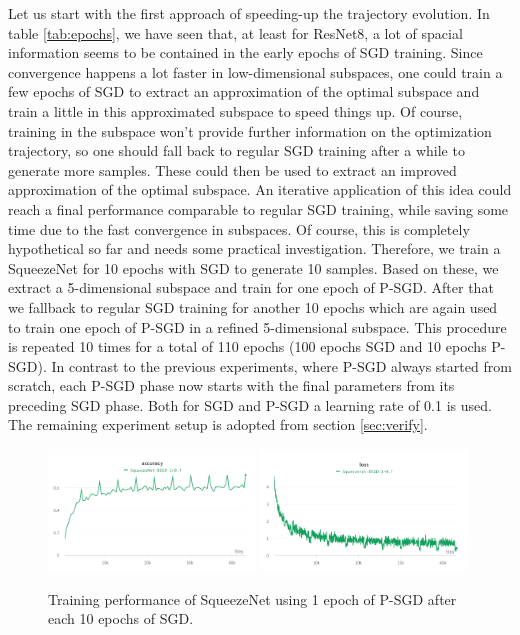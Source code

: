 \documentclass[11pt, a4paper]{article}
\begin{document}
Let us start with the first approach of speeding-up the trajectory evolution. In table \ref{tab:epochs}, we have seen that, at least for ResNet8, a lot of spacial information seems to be contained in the early epochs of SGD training. Since convergence happens a lot faster in low-dimensional subspaces, one could train a few epochs of SGD to extract an approximation of the optimal subspace and train a little in this approximated subspace to speed things up. Of course, training in the subspace won't provide further information on the optimization trajectory, so one should fall back to regular SGD training after a while to generate more samples. These could then be used to extract an improved approximation of the optimal subspace. An iterative application of this idea could reach a final performance comparable to regular SGD training, while saving some time due to the fast convergence in subspaces. Of course, this is completely hypothetical so far and needs some practical investigation. 
Therefore, we train a SqueezeNet for 10 epochs with SGD to generate 10 samples. Based on these, we extract a 5-dimensional subspace and train for one epoch of P-SGD. After that we fallback to regular SGD training for another 10 epochs which are again used to train one epoch of P-SGD in a refined 5-dimensional subspace. This procedure is repeated 10 times for a total of 110 epochs (100 epochs SGD and 10 epochs P-SGD). In contrast to the previous experiments, where P-SGD always started from scratch, each P-SGD phase now starts with the final parameters from its preceding SGD phase. Both for SGD and P-SGD a learning rate of 0.1 is used. The remaining experiment setup is adopted from section \ref{sec:verify}. \\

\begin{figure}[!h]
\centering
{\includegraphics[width=0.49\textwidth]{images/exp5-accuracy.png}}
{\includegraphics[width=0.49\textwidth]{images/exp5-loss.png}}
\parbox{12cm}{\centering \caption{\centering Training performance of SqueezeNet using 1 epoch of P-SGD after each 10 epochs of SGD. \label{fig:refinement}}}
\end{figure}
\end{document}
